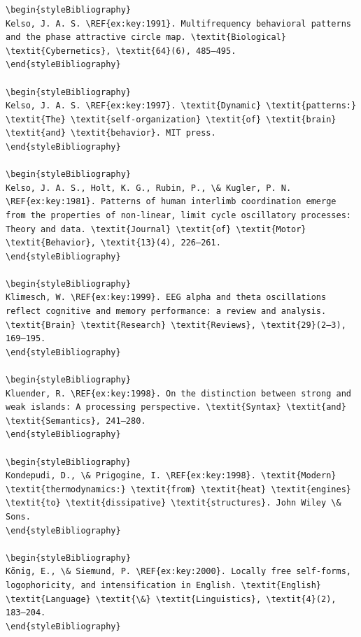\begin{verbatim}
\begin{styleBibliography}
Kelso, J. A. S. \REF{ex:key:1991}. Multifrequency behavioral patterns and the phase attractive circle map. \textit{Biological} \textit{Cybernetics}, \textit{64}(6), 485–495.
\end{styleBibliography}

\begin{styleBibliography}
Kelso, J. A. S. \REF{ex:key:1997}. \textit{Dynamic} \textit{patterns:} \textit{The} \textit{self-organization} \textit{of} \textit{brain} \textit{and} \textit{behavior}. MIT press.
\end{styleBibliography}

\begin{styleBibliography}
Kelso, J. A. S., Holt, K. G., Rubin, P., \& Kugler, P. N. \REF{ex:key:1981}. Patterns of human interlimb coordination emerge from the properties of non-linear, limit cycle oscillatory processes: Theory and data. \textit{Journal} \textit{of} \textit{Motor} \textit{Behavior}, \textit{13}(4), 226–261.
\end{styleBibliography}

\begin{styleBibliography}
Klimesch, W. \REF{ex:key:1999}. EEG alpha and theta oscillations reflect cognitive and memory performance: a review and analysis. \textit{Brain} \textit{Research} \textit{Reviews}, \textit{29}(2–3), 169–195.
\end{styleBibliography}

\begin{styleBibliography}
Kluender, R. \REF{ex:key:1998}. On the distinction between strong and weak islands: A processing perspective. \textit{Syntax} \textit{and} \textit{Semantics}, 241–280.
\end{styleBibliography}

\begin{styleBibliography}
Kondepudi, D., \& Prigogine, I. \REF{ex:key:1998}. \textit{Modern} \textit{thermodynamics:} \textit{from} \textit{heat} \textit{engines} \textit{to} \textit{dissipative} \textit{structures}. John Wiley \& Sons.
\end{styleBibliography}

\begin{styleBibliography}
König, E., \& Siemund, P. \REF{ex:key:2000}. Locally free self-forms, logophoricity, and intensification in English. \textit{English} \textit{Language} \textit{\&} \textit{Linguistics}, \textit{4}(2), 183–204.
\end{styleBibliography}


\end{verbatim}
